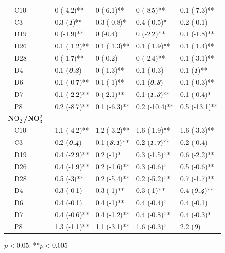 \documentclass[journal = esthag, manuscript = article]{achemso}\usepackage[]{graphicx}\usepackage[]{color}
\begin{document}
\begin{table}[!tbp]
\begin{center}
\begin{tabular}{lllll}
~~C10&0 \footnotesize{(-4.2)**}&0 \footnotesize{(-6.1)**}&0 \footnotesize{(-8.5)**}&0.1 \footnotesize{(-7.3)**}\tabularnewline
~~C3&0.3 \footnotesize{(\textit{\textbf{1}})**}&0.3 \footnotesize{(-0.8)*}&0.4 \footnotesize{(-0.5)*}&0.2 \footnotesize{(-0.1)}\tabularnewline
~~D19&0 \footnotesize{(-1.9)**}&0 \footnotesize{(-0.4)}&0 \footnotesize{(-2.2)**}&0.1 \footnotesize{(-1.8)**}\tabularnewline
~~D26&0.1 \footnotesize{(-1.2)**}&0.1 \footnotesize{(-1.3)**}&0.1 \footnotesize{(-1.9)**}&0.1 \footnotesize{(-1.4)**}\tabularnewline
~~D28&0 \footnotesize{(-1.7)**}&0 \footnotesize{(-0.2)}&0 \footnotesize{(-2.4)**}&0.1 \footnotesize{(-3.1)**}\tabularnewline
~~D4&0.1 \footnotesize{(\textit{\textbf{0.3}})}&0 \footnotesize{(-1.3)**}&0.1 \footnotesize{(-0.3)}&0.1 \footnotesize{(\textit{\textbf{1}})**}\tabularnewline
~~D6&0.1 \footnotesize{(-0.7)**}&0.1 \footnotesize{(-1)**}&0.1 \footnotesize{(\textit{\textbf{0.3}})}&0.1 \footnotesize{(-0.3)**}\tabularnewline
~~D7&0.1 \footnotesize{(-2.2)**}&0 \footnotesize{(-2.1)**}&0.1 \footnotesize{(\textit{\textbf{1.3}})**}&0.1 \footnotesize{(-0.4)*}\tabularnewline
~~P8&0.2 \footnotesize{(-8.7)**}&0.1 \footnotesize{(-6.3)**}&0.2 \footnotesize{(-10.4)**}&0.5 \footnotesize{(-13.1)**}\tabularnewline
\hline
{\bfseries NO$_{2}^{-}$/NO$_{3}^{2-}$}&&&&\tabularnewline
~~C10&1.1 \footnotesize{(-4.2)**}&1.2 \footnotesize{(-3.2)**}&1.6 \footnotesize{(-1.9)**}&1.6 \footnotesize{(-3.3)**}\tabularnewline
~~C3&0.2 \footnotesize{(\textit{\textbf{0.4}})}&0.1 \footnotesize{(\textit{\textbf{3.1}})**}&0.2 \footnotesize{(\textit{\textbf{1.7}})**}&0.2 \footnotesize{(-0.4)}\tabularnewline
~~D19&0.4 \footnotesize{(-2.9)**}&0.2 \footnotesize{(-1)*}&0.3 \footnotesize{(-1.5)**}&0.6 \footnotesize{(-2.2)**}\tabularnewline
~~D26&0.4 \footnotesize{(-1.9)**}&0.2 \footnotesize{(-1.6)**}&0.3 \footnotesize{(-0.6)*}&0.5 \footnotesize{(-0.6)**}\tabularnewline
~~D28&0.5 \footnotesize{(-3)**}&0.2 \footnotesize{(-5.4)**}&0.2 \footnotesize{(-5.2)**}&0.7 \footnotesize{(-1.7)**}\tabularnewline
~~D4&0.3 \footnotesize{(-0.1)}&0.3 \footnotesize{(-1)**}&0.3 \footnotesize{(-1)**}&0.4 \footnotesize{(\textit{\textbf{0.4}})**}\tabularnewline
~~D6&0.4 \footnotesize{(-0.1)}&0.4 \footnotesize{(-1)**}&0.4 \footnotesize{(-0.4)*}&0.4 \footnotesize{(-0.1)}\tabularnewline
~~D7&0.4 \footnotesize{(-0.6)**}&0.4 \footnotesize{(-1.2)**}&0.4 \footnotesize{(-0.8)**}&0.4 \footnotesize{(-0.3)*}\tabularnewline
~~P8&1.3 \footnotesize{(-1.1)**}&1.1 \footnotesize{(-3.1)**}&1.6 \footnotesize{(-0.3)*}&2.2 \footnotesize{(\textit{\textbf{0}})}\tabularnewline
\hline
\end{tabular}\end{center}

\footnotesize *$p<0.05$; **$p<0.005$\end{table}
\end{document}
